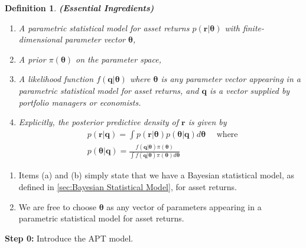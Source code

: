 \documentclass[13pt]{article}
\newtheorem{definition}[theorem]{Definition}
\theoremstyle{definition}
\theoremstyle{remark}
\newenvironment{remark}
  {\pushQED{\qed}\renewcommand{\qedsymbol}{$\triangle$}\remarkx}
  {\popQED\endremarkx}
\begin{document}
\begin{definition}\label{def:Essential Ingredients of the BLB model}
    \textbf{(Essential Ingredients)} 
    \begin{enumerate}[label=(\alph*)]
        \item A parametric statistical model for asset returns $p(\bm{r} | \bm{\theta})$ with finite-dimensional parameter vector $\bm{\theta}$,
        \item A prior $\pi(\bm{\theta})$ on the parameter space,
        \item A likelihood function $f(\bm{q} | \bm{\theta})$ where $\bm{\theta}$ is any parameter vector appearing in a parametric statistical model for asset returns, and $\bm{q}$ is a vector supplied by portfolio managers or economists.
        \item Explicitly, the posterior predictive density of $\bm{r}$ is given by
$$
\begin{aligned}
& p(\bm{r} | \bm{q})=\int p(\bm{r} | \bm{\theta}) p(\bm{\theta} | \bm{q}) d \bm{\theta} \quad \text { where } \\
& p(\bm{\theta} | \bm{q})=\frac{f(\bm{q} | \bm{\theta}) \pi(\bm{\theta})}{\int f(\bm{q} | \bm{\theta}) \pi(\bm{\theta}) d \bm{\theta}}
\end{aligned}
$$
    \end{enumerate}
\end{definition} 
\begin{remark}\hfill
\begin{enumerate}
    \item  Items (a) and (b) simply state that we have a Bayesian statistical model, as defined in \cref{sec:Bayesian Statistical Model}, for asset returns.
    \item We are free to choose $\boldsymbol{\theta}$ as any vector of parameters appearing in a parametric statistical model for asset returns.
\end{enumerate}
   
\end{remark}

{\color{C6}\textbf{Step 0:} Introduce the APT model.}
\end{document}
